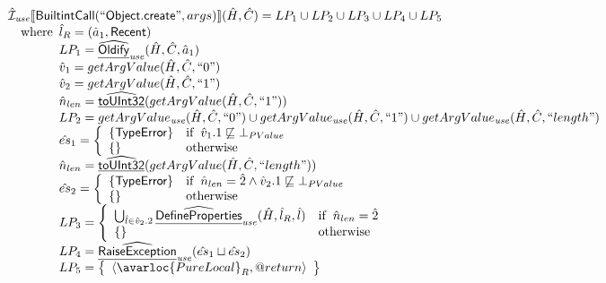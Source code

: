 \[\begin{array}{l}
\aI_{\it use}\lbr \SF{BuiltintCall}(``\SF{Object.create}",args)\rbr(\hat{H},\hat{C}) = LP_1 \cup LP_2 \cup LP_3 \cup LP_4 \cup LP_5\\
\quad\wherec{
  \hat{l}_R = (\hat{a}_1, \SF{Recent})\\
  LP_1 = \ahf{Oldify}_{\it use}(\hat{H}, \hat{C}, \hat{a}_1)\\
  \hat{v}_1 = getArgValue(\hat{H}, \hat{C}, ``0")\\
  \hat{v}_{2} = getArgValue(\hat{H},\hat{C}, ``1")\\
  \hat{n}_{len} = \ahf{toUInt32}(getArgValue(\hat{H},\hat{C}, ``1"))\\
  LP_2 = getArgValue_{\it use}(\hat{H}, \hat{C}, ``0") \cup  getArgValue_{\it use}(\hat{H}, \hat{C}, ``1")
    \cup  getArgValue_{\it use}(\hat{H}, \hat{C}, ``length")\\
  \hat{es}_1 = \left\{\begin{array}{ll}
      \{ \SF{TypeError} \}
      & \ifc{\hat{v}_1.1 \not\sqsubseteq \bot_{PValue}}\\
      \set{} & \owc
    \end{array}\right.\\
  \hat{n}_{len} = \ahf{toUInt32}(getArgValue(\hat{H},\hat{C}, ``length"))\\
  \hat{es}_2 = \left\{\begin{array}{ll}
      \{ \SF{TypeError} \}
      & \ifc{\hat{n}_{len} = \hat{2} \land \hat{v}_2.1 \not\sqsubseteq \bot_{PValue}}\\
      \set{} & \owc
    \end{array}\right.\\
  LP_3 = \left\{\begin{array}{ll}
      \bigcup_{\hat{l} \in \hat{v}_2.2} \ahf{DefineProperties}_{\it use}(\hat{H}, \hat{l}_R, \hat{l})
      & \ifc{\hat{n}_{len} = \hat{2}}\\
      \set{} & \owc
    \end{array}\right.\\
  LP_4 = \ahf{RaiseException}_{\it use}(\hat{es}_1 \sqcup \hat{es}_2)\\
  LP_5 = \set{\langle\avarloc{PureLocal}_R,\varprop{return}\rangle}\\
  }\\
\\




\end{array}\]

